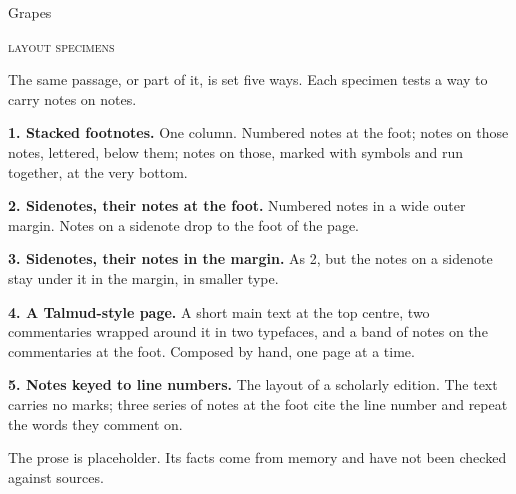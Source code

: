 \documentclass[11pt]{article}
\begin{document}
\begin{center}
{\Huge Grapes}\par\medskip
{\scshape\color{grapeink} layout specimens}\par
\end{center}
\bigskip
The same passage, or part of it, is set five ways. Each specimen tests a way
to carry notes on notes.

\textbf{1. Stacked footnotes.} One column. Numbered notes at the foot; notes
on those notes, lettered, below them; notes on those, marked with symbols and
run together, at the very bottom.

\textbf{2. Sidenotes, their notes at the foot.} Numbered notes in a wide
outer margin. Notes on a sidenote drop to the foot of the page.

\textbf{3. Sidenotes, their notes in the margin.} As 2, but the notes on a
sidenote stay under it in the margin, in smaller type.

\textbf{4. A Talmud-style page.} A short main text at the top centre, two
commentaries wrapped around it in two typefaces, and a band of notes on the
commentaries at the foot. Composed by hand, one page at a time.

\textbf{5. Notes keyed to line numbers.} The layout of a scholarly edition.
The text carries no marks; three series of notes at the foot cite the line
number and repeat the words they comment on.

\vfill
{\small\color{grapeink} The prose is placeholder. Its facts come from memory
and have not been checked against sources.}
\end{document}
